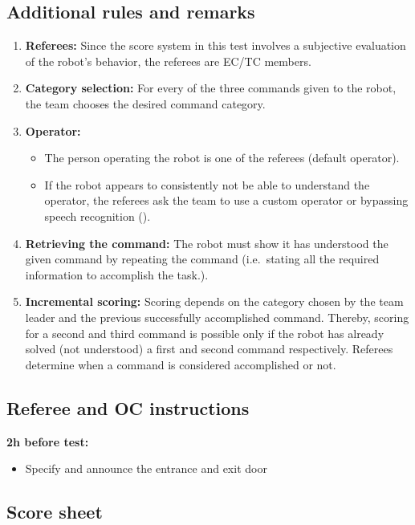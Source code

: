 \subsection{Additional rules and remarks}
\label{sec:gpsr_remarks}
\begin{enumerate}
	\item \textbf{Referees:} Since the score system in this test involves a subjective evaluation of the robot's behavior, the referees are EC/TC members.

	\item \textbf{Category selection:} For every of the three commands given to the robot, the team chooses the desired command category.

	\item \textbf{Operator:}
	\begin{itemize}
		\item The person operating the robot is one of the referees (default operator).
		\item If the robot appears to consistently not be able to understand the operator, the referees ask the team to use a custom operator or bypassing speech recognition ().
	\end{itemize}

	\item \textbf{Retrieving the command:} The robot must show it has understood the given command by repeating the command (i.e.~stating all the required information to accomplish the task.).
	\item \textbf{Incremental scoring:} Scoring depends on the category chosen by the team leader and the previous successfully accomplished command. Thereby, scoring for a second and third command is possible only if the robot has already solved (not understood) a first and second command respectively. Referees determine when a command is considered accomplished or not.
\end{enumerate}

\subsection{Referee and OC instructions}
\textbf{2h before test:}
\begin{itemize}
	\item Specify and announce the entrance and exit door
\end{itemize}

\newpage
\subsection{Score sheet}


